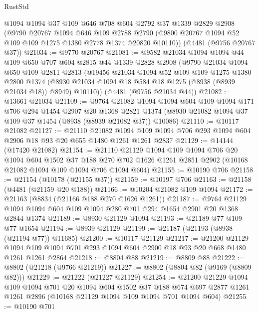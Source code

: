 \begin{lexlean}{RustStd}
\begin{coremodule}
    @1094
    @1094
    @37
    @109
    @646
    @708
    @604
    @2792
    @37
    @1339
    @2829
    @2908
    (@9790
      @20767
      @1094
      @646
      @109
      @2788
      @2790
      (@9800 @20767 @1094 @52 @109 @109 @1275 @1380 @2778 @1374 @20820 @10110))
    (@4481 (@9756 @20767 @37))
@21034 := @9770 @20767
@21081 := @9582
    @21034
    @1094
    @1094
    @44
    @109
    @650
    @707
    @604
    @2815
    @44
    @1339
    @2828
    @2908
    (@9790
      @21034
      @1094
      @650
      @109
      @2811
      @2813
      (@19456
        @21034
        @1094
        @52
        @109
        @109
        @1275
        @1380
        @2800
        @1374
        (@8930 @21034 @1094 @18 @584 @18 @1275 (@8938 (@8939 @21034 @18)) @8949)
        @10110))
    (@4481 (@9756 @21034 @44))
@21082 := @13661 @21034
@21109 := @9764
    @21082
    @1094
    @1094
    @604
    @109
    @1094
    @171
    @706
    @294
    @1454
    @2907
    @20
    @1368
    @2821
    @1374
    (@8930 @21082 @1094 @37 @109 @37 @1454 (@8938 (@8939 @21082 @37)) @10086)
@21110 := @10117 @21082
@21127 := @21110
    @21082
    @1094
    @109
    @1094
    @706
    @293
    @1094
    @604
    @2906
    @18
    @93
    @20
    @655
    @1480
    @1261
    @1261
    @2837
@21129 := @14144 (@17420 @21082)
@21154 := @21110
    @21129
    @1094
    @109
    @1094
    @706
    @20
    @1094
    @604
    @1502
    @37
    @188
    @270
    @702
    @1626
    @1261
    @2851
    @2902
    (@10168 @21082 @1094 @109 @1094 @706 @1094 @604)
@21155 := @10190 @706
@21158 := @21154 (@10178 (@21155 @37))
@21159 := @10197 @706
@21163 := @21158 (@4481 (@21159 @20 @188))
@21166 := @10204 @21082 @109 @1094
@21172 := @21163 (@8834 (@21166 @188 @270 @1626 @1261))
@21187 := @9764 @21129 @1094 @1094 @604 @109 @1094 @280 @701 @294 @1654 @2901 @20 @1368 @2844 @1374
@21189 := @8930 @21129 @1094
@21193 := @21189 @77 @109 @77 @1654
@21194 := @8939 @21129
@21199 := @21187 (@21193 (@8938 (@21194 @77)) @11685)
@21200 := @10117 @21129
@21217 := @21200
    @21129
    @1094
    @109
    @1094
    @701
    @293
    @1094
    @604
    @2900
    @18
    @93
    @20
    @668
    @1480
    @1261
    @1261
    @2864
@21218 := @8804 @88
@21219 := @8809 @88
@21222 := @8802 (@21218 (@9766 @21219))
@21227 := @8802 (@8804 @82 (@9169 (@8809 @82)))
@21229 := @21222 (@21227 @21129)
@21254 := @21200
    @21229
    @1094
    @109
    @1094
    @701
    @20
    @1094
    @604
    @1502
    @37
    @188
    @674
    @697
    @2877
    @1261
    @1261
    @2896
    (@10168 @21129 @1094 @109 @1094 @701 @1094 @604)
@21255 := @10190 @701

\end{coremodule}
\end{lexlean}
